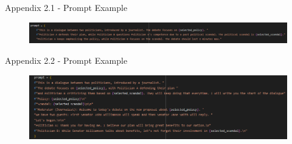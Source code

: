 \documentclass[10pt, aspectratio=169]{beamer}
\begin{document}
\begin{frame}{Appendix 2.1 - Prompt Example}
        \begin{figure}
        \centering
        \includegraphics[width=\linewidth]{images/Prompt 1.png}
        \label{fig:appendix_prompt1}
    \end{figure}  
\end{frame}

\begin{frame}{Appendix 2.2 - Prompt Example}
        \begin{figure}
        \centering
        \includegraphics[width=\linewidth]{images/prompt 2.png}
        \label{fig:appendix_prompt2}
    \end{figure}  
\end{frame}
\end{document}
